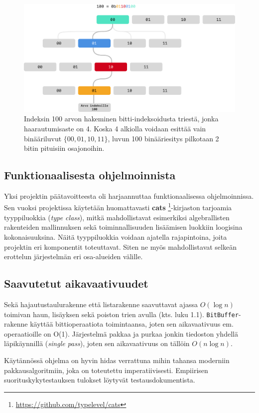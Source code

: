 \documentclass{article}
\newcommand{\code}{\texttt}
\begin{document}
\begin{figure}
  \includegraphics[width=\linewidth]{trie}
  \caption{Indeksin 100 arvon hakeminen bitti-indeksoidusta triestä, jonka haarautumisaste on 4. Koska 4 alkiolla voidaan esittää vain binääriluvut $\{00, 01, 10, 11\}$, luvun 100 binääriesitys pilkotaan 2 bitin pituisiin osajonoihin.}
  \label{fig:trie}
\end{figure}

\subsection{Funktionaalisesta ohjelmoinnista}

Yksi projektin päätavoitteesta oli harjaannuttaa funktionaalisessa ohjelmoinnissa. Sen vuoksi projektissa käytetään
huomattavasti \textbf{cats} \footnote{\url{https://github.com/typelevel/cats}}-kirjaston tarjoamia tyyppiluokkia (\textit{type class}), mitkä mahdollistavat
esimerkiksi algebrallisten rakenteiden mallinnuksen sekä toiminnallisuuden lisäämisen luokkiin loogisina kokonaisuuksina.
Näitä tyyppiluokkia voidaan ajatella rajapintoina, joita projektin eri komponentit toteuttavat.
Siten ne myös mahdollistavat selkeän erottelun järjestelmän eri osa-alueiden välille.

\subsection{Saavutetut aikavaativuudet}

Sekä hajautustaulurakenne että listarakenne saavuttavat ajassa $O(\log n)$ toimivan haun, lisäyksen sekä poiston trien avulla
(kts. luku 1.1). \code{BitBuffer}-rakenne käyttää bittioperaatiota toimintaansa, joten sen aikavaativuus em. operaatioille on O(1).
Järjestelmä pakkaa ja purkaa jonkin tiedoston yhdellä läpikäynnillä (\textit{single pass}), joten sen aikavaativuus on tällöin
$O(n \log n)$.

Käytännössä ohjelma on hyvin hidas verrattuna mihin tahansa moderniin pakkausalgoritmiin, joka on toteutettu imperatiivisesti. Empiirisen suorituskykytestauksen tulokset löytyvät testausdokumentista.

\printbibliography
\end{document}
